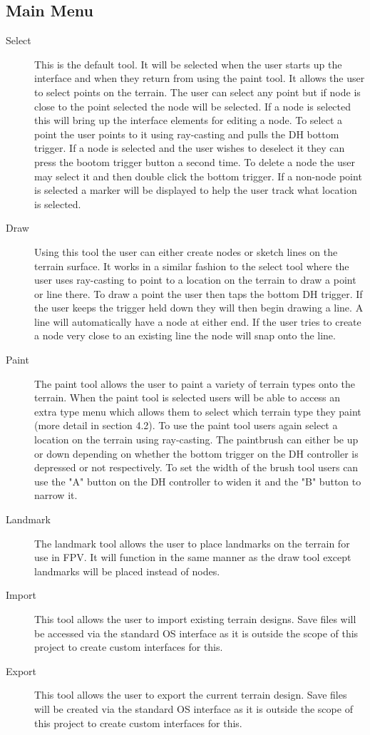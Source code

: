 \documentclass{sig-alternate-05-2015}
\begin{document}
\subsection{Main Menu}
\begin{description}
	\item[Select] This is the default tool. It will be selected when the user starts up the interface and when they return from using the paint tool. It allows the user to select points on the terrain. The user can select any point but if node is close to the point selected the node will be selected. If a node is selected this will bring up the interface elements for editing a node. To select a point the user points to it using ray-casting and pulls the DH bottom trigger. If a node is selected and the user wishes to deselect it they can press the bootom trigger button a second time. To delete a node the user may select it and then double click the bottom trigger. If a non-node point is selected a marker will be displayed to help the user track what location is selected.
	\item[Draw] Using this tool the user can either create nodes or sketch lines on the terrain surface. It works in a similar fashion to the select tool where the user uses ray-casting to point to a location on the terrain to draw a point or line there. To draw a point the user then taps the bottom DH trigger. If the user keeps the trigger held down they will then begin drawing a line. A line will automatically have a node at either end. If the user tries to create a node very close to an existing line the node will snap onto the line.
	\item[Paint] The paint tool allows the user to paint a variety of terrain types onto the terrain. When the paint tool is selected users will be able to access an extra type menu which allows them to select which terrain type they paint (more detail in section 4.2). To use the paint tool users again select a location on the terrain using ray-casting. The paintbrush can either be up or down depending on whether the bottom trigger on the DH controller is depressed or not respectively. To set the width of the brush tool users can use the "A" button on the DH controller to widen it and the "B" button to narrow it.
	\item [Landmark] The landmark tool allows the user to place landmarks on the terrain for use in FPV. It will function in the same manner as the draw tool except landmarks will be placed instead of nodes.
	\item[Import] This tool allows the user to import existing terrain designs. Save files will be accessed via the standard OS interface as it is outside the scope of this project to create custom interfaces for this.
	\item[Export] This tool allows the user to export the current terrain design. Save files will be created via the standard OS interface as it is outside the scope of this project to create custom interfaces for this.
\end{description}
\end{document}
